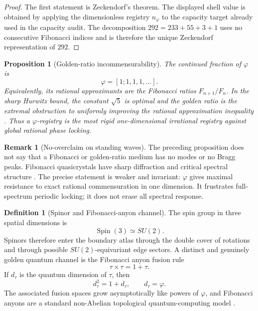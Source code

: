 \documentclass[aps,prd,reprint,nofootinbib,superscriptaddress,floatfix]{revtex4-2}
\numberwithin{equation}{section}
\theoremstyle{definition}
\newtheorem{definition}{Definition}[section]
\newtheorem{remark}{Remark}[section]
\theoremstyle{plain}
\newtheorem{proposition}{Proposition}[section]
\begin{document}
\begin{proof}
The first statement is Zeckendorf's theorem.  The displayed shell value
is obtained by applying the dimensionless registry \(n_\varphi\) to the
capacity target already used in the capacity audit.  The decomposition
\(292=233+55+3+1\) uses no consecutive Fibonacci indices and is therefore
the unique Zeckendorf representation of \(292\).
\end{proof}

\begin{proposition}[Golden-ratio incommensurability]
The continued fraction of \(\varphi\) is
\begin{equation}
\varphi=[1;1,1,1,\ldots].
\end{equation}
Equivalently, its rational approximants are the Fibonacci ratios
\(F_{n+1}/F_n\).  In the sharp Hurwitz bound, the constant \(\sqrt5\)
is optimal and the golden ratio is the extremal obstruction to uniformly
improving the rational approximation inequality
\cite{HardyWright2008}.  Thus a \(\varphi\)-registry is the most rigid
one-dimensional irrational registry against global rational phase
locking.
\end{proposition}

\begin{remark}[No-overclaim on standing waves]
The preceding proposition does not say that a Fibonacci or golden-ratio
medium has no modes or no Bragg peaks.  Fibonacci quasicrystals have
sharp diffraction and critical spectral structure \cite{Senechal1995,
Jagannathan2021}.  The precise statement is weaker and invariant:
\(\varphi\) gives maximal resistance to exact rational commensuration in
one dimension.  It frustrates full-spectrum periodic locking; it does
not erase all spectral response.
\end{remark}

\begin{definition}[Spinor and Fibonacci-anyon channel]
The spin group in three spatial dimensions is
\begin{equation}
\operatorname{Spin}(3)\simeq SU(2).
\end{equation}
Spinors therefore enter the boundary atlas through the double cover of
rotations and through possible \(SU(2)\)-equivariant edge sectors.
A distinct and genuinely golden quantum channel is the Fibonacci anyon
fusion rule
\begin{equation}
\tau\times\tau=1+\tau .
\end{equation}
If \(d_\tau\) is the quantum dimension of \(\tau\), then
\begin{equation}
d_\tau^2=1+d_\tau,
\qquad
d_\tau=\varphi .
\end{equation}
The associated fusion spaces grow asymptotically like powers of
\(\varphi\), and Fibonacci anyons are a standard non-Abelian topological
quantum-computing model \cite{NayakEtAl2008}.
\end{definition}
\end{document}
